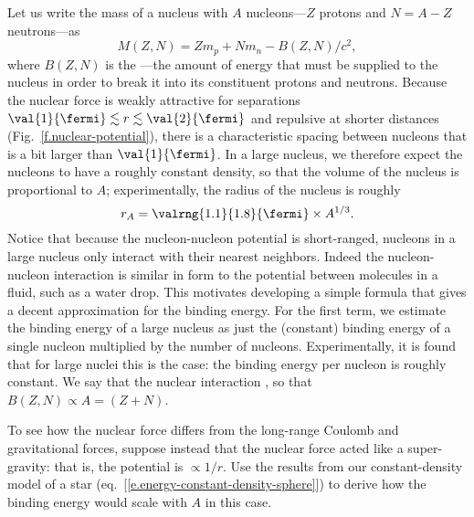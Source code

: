  Let us write the mass of a nucleus with $A$ nucleons---$Z$ protons and $N=A-Z$ neutrons---as
\[
	M(Z,N) = Zm_{p} + Nm_{n} - B(Z,N)/c^{2},
\]
where $B(Z,N)$ is the ---the amount of energy that must be supplied to the nucleus in order to break it into its constituent protons and neutrons.%
%
Because the nuclear force is weakly attractive for separations $\val{1}{\fermi}\lesssim r\lesssim\val{2}{\fermi}$ and repulsive at shorter distances (Fig.~\ref{f.nuclear-potential}), there is a characteristic spacing between nucleons that is a bit larger than $\val{1}{\fermi}$. In a large nucleus, we therefore expect the nucleons to have a roughly constant density, so that the volume of the nucleus is proportional to $A$; experimentally, the radius of the nucleus is roughly
\[
	r_{A} = \valrng{1.1}{1.8}{\fermi}\times A^{1/3}.
\]
Notice that because the nucleon-nucleon potential is short-ranged, nucleons in a large nucleus only interact with their nearest neighbors. Indeed the nucleon-nucleon interaction is similar in form to the potential between molecules in a fluid, such as a water drop. This motivates developing a simple formula that gives a decent approximation for the binding energy. For the first term, we estimate the binding energy of a large nucleus as just the (constant) binding energy of a single nucleon multiplied by the number of nucleons. Experimentally, it is found that for large nuclei this is the case: the binding energy per nucleon is roughly constant. We say that the nuclear interaction , so that $B(Z,N) \propto A = (Z+N)$.

\begin{exercisebox}
To see how the nuclear force differs from the long-range Coulomb and gravitational forces, suppose instead that the nuclear force acted like a super-gravity: that is, the potential is $\propto 1/r$. Use the results from our constant-density model of a star (eq.~[\ref{e.energy-constant-density-sphere}]) to derive how the binding energy would scale with $A$ in this case.
\end{exercisebox}

